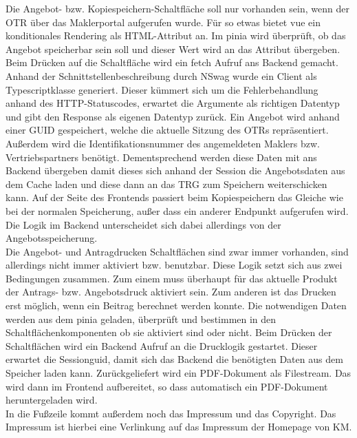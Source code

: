 Die Angebot- bzw. Kopiespeichern-Schaltfläche soll nur vorhanden sein, wenn der \ac{OTR} über das Maklerportal aufgerufen wurde. Für so etwas bietet \gls{vue} ein konditionales Rendering als \gls{HTML}-Attribut an. Im \gls{pinia} wird überprüft, ob das Angebot speicherbar sein soll und dieser Wert wird an das Attribut übergeben. Beim Drücken auf die Schaltfläche wird ein \gls{fetch} Aufruf ans Backend gemacht. Anhand der Schnittstellenbeschreibung durch \gls{NSwag} wurde ein Client als Typescriptklasse generiert. Dieser kümmert sich um die Fehlerbehandlung anhand des \gls{HTTP}-Statuscodes, erwartet die Argumente als richtigen Datentyp und gibt den Response als eigenen Datentyp zurück. Ein Angebot wird anhand einer \ac{GUID} gespeichert, welche die aktuelle Sitzung des \ac{OTR}s repräsentiert. Außerdem wird die Identifikationsnummer des angemeldeten Maklers bzw. Vertriebspartners benötigt. Dementsprechend werden diese Daten mit ans Backend übergeben damit dieses sich anhand der Session die Angebotsdaten aus dem Cache laden und diese dann an das \ac{TRG} zum Speichern weiterschicken kann. Auf der Seite des Frontends passiert beim Kopiespeichern das Gleiche wie bei der normalen Speicherung, außer dass ein anderer Endpunkt aufgerufen wird. Die Logik im Backend unterscheidet sich dabei allerdings von der Angebotsspeicherung.\\

Die Angebot- und Antragdrucken Schaltflächen sind zwar immer vorhanden, sind allerdings nicht immer aktiviert bzw. benutzbar. Diese Logik setzt sich aus zwei Bedingungen zusammen. Zum einem muss überhaupt für das aktuelle Produkt der Antrags- bzw. Angebotsdruck aktiviert sein. Zum anderen ist das Drucken erst möglich, wenn ein Beitrag berechnet werden konnte. Die notwendigen Daten werden aus dem \gls{pinia} geladen, überprüft und bestimmen in den Schaltflächenkomponenten ob sie aktiviert sind oder nicht. Beim Drücken der Schaltflächen wird ein Backend Aufruf an die Drucklogik gestartet. Dieser erwartet die Sessionguid, damit sich das Backend die benötigten Daten aus dem Speicher laden kann. Zurückgeliefert wird ein PDF-Dokument als Filestream. Das wird dann im Frontend aufbereitet, so dass automatisch ein PDF-Dokument heruntergeladen wird.\\
In die Fußzeile kommt außerdem noch das Impressum und das Copyright. Das Impressum ist hierbei eine Verlinkung auf das Impressum der Homepage von \ac{KM}.
